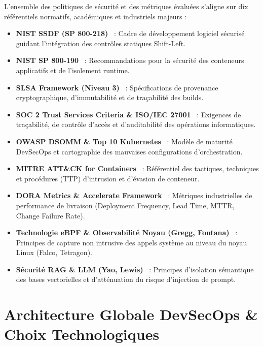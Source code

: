 L'ensemble des politiques de sécurité et des métriques évaluées s'aligne sur dix référentiels normatifs, académiques et industriels majeurs :
\begin{itemize}
    \item \textbf{NIST SSDF (SP 800-218)}~\cite{nist_ssdf_800_218} : Cadre de développement logiciel sécurisé guidant l'intégration des contrôles statiques Shift-Left.
    \item \textbf{NIST SP 800-190}~\cite{nist_sp_800_190} : Recommandations pour la sécurité des conteneurs applicatifs et de l'isolement runtime.
    \item \textbf{SLSA Framework (Niveau 3)}~\cite{slsa_spec_v1} : Spécifications de provenance cryptographique, d'immutabilité et de traçabilité des builds.
    \item \textbf{SOC 2 Trust Services Criteria \& ISO/IEC 27001}~\cite{soc2_trust_services_criteria, iso_27001_2022} : Exigences de traçabilité, de contrôle d'accès et d'auditabilité des opérations informatiques.
    \item \textbf{OWASP DSOMM \& Top 10 Kubernetes}~\cite{owasp_dsomm, owasp_k8s_top10} : Modèle de maturité DevSecOps et cartographie des mauvaises configurations d'orchestration.
    \item \textbf{MITRE ATT\&CK for Containers}~\cite{mitre_attack_containers} : Référentiel des tactiques, techniques et procédures (TTP) d'intrusion et d'évasion de conteneur.
    \item \textbf{DORA Metrics \& Accelerate Framework}~\cite{dora_metrics_2018} : Métriques industrielles de performance de livraison (Deployment Frequency, Lead Time, MTTR, Change Failure Rate).
    \item \textbf{Technologie eBPF \& Observabilité Noyau (Gregg, Fontana)}~\cite{gregg_ebpf_2020, fontana_ebpf_security} : Principes de capture non intrusive des appels système au niveau du noyau Linux (Falco, Tetragon).
    \item \textbf{Sécurité RAG \& LLM (Yao, Lewis)}~\cite{yao_rag_security, lewis_rag_2020} : Principes d'isolation sémantique des bases vectorielles et d'atténuation du risque d'injection de prompt.
\end{itemize}




\section{Architecture Globale DevSecOps \& Choix Technologiques}
\label{sec:architecture_globale_devsecops}

